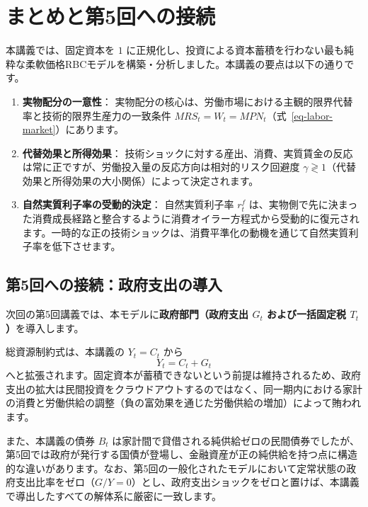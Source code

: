 \documentclass[
  japanese,
  lualatex,
  ja=standard,
  12pt,
  a4paper]{ltjsarticle}
\providecommand{\tightlist}{%
  \setlength{\itemsep}{0pt}\setlength{\parskip}{0pt}}
\begin{document}
\section{まとめと第5回への接続}\label{ux307eux3068ux3081ux3068ux7b2c5ux56deux3078ux306eux63a5ux7d9a}

本講義では、固定資本を \(1\)
に正規化し、投資による資本蓄積を行わない最も純粋な柔軟価格RBCモデルを構築・分析しました。本講義の要点は以下の通りです。

\begin{enumerate}
\def\labelenumi{\arabic{enumi}.}
\tightlist
\item
  \textbf{実物配分の一意性}：
  実物配分の核心は、労働市場における主観的限界代替率と技術的限界生産力の一致条件
  \(MRS_t = W_t = MPN_t\)（式~\ref{eq-labor-market}）にあります。
\item
  \textbf{代替効果と所得効果}：
  技術ショックに対する産出、消費、実質賃金の反応は常に正ですが、労働投入量の反応方向は相対的リスク回避度
  \(\gamma \gtrless 1\)（代替効果と所得効果の大小関係）によって決定されます。
\item
  \textbf{自然実質利子率の受動的決定}： 自然実質利子率 \(r_t^f\)
  は、実物側で先に決まった消費成長経路と整合するように消費オイラー方程式から受動的に復元されます。一時的な正の技術ショックは、消費平準化の動機を通じて自然実質利子率を低下させます。
\end{enumerate}

\subsection{第5回への接続：政府支出の導入}\label{ux7b2c5ux56deux3078ux306eux63a5ux7d9aux653fux5e9cux652fux51faux306eux5c0eux5165}

次回の第5回講義では、本モデルに\textbf{政府部門（政府支出 \(G_t\)
および一括固定税 \(T_t\)）}を導入します。

総資源制約式は、本講義の \(Y_t = C_t\) から \[
Y_t = C_t + G_t
\]
へと拡張されます。固定資本が蓄積できないという前提は維持されるため、政府支出の拡大は民間投資をクラウドアウトするのではなく、同一期内における家計の消費と労働供給の調整（負の富効果を通じた労働供給の増加）によって賄われます。

また、本講義の債券 \(B_t\)
は家計間で貸借される純供給ゼロの民間債券でしたが、第5回では政府が発行する国債が登場し、金融資産が正の純供給を持つ点に構造的な違いがあります。なお、第5回の一般化されたモデルにおいて定常状態の政府支出比率をゼロ（\(G/Y = 0\)）とし、政府支出ショックをゼロと置けば、本講義で導出したすべての解体系に厳密に一致します。
\end{document}
